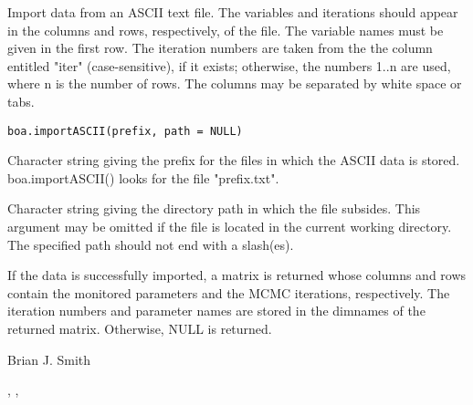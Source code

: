 \begin{Description}\relax
Import data from an ASCII text file. The variables and iterations should
appear in the columns and rows, respectively, of the file. The variable names
must be given in the first row. The iteration numbers are taken from the the
column entitled "iter" (case-sensitive), if it exists; otherwise, the numbers 
1..n are used, where n is the number of rows. The columns may be separated by
white space or tabs.
\end{Description}
\begin{Usage}
\begin{verbatim}
boa.importASCII(prefix, path = NULL)
\end{verbatim}
\end{Usage}
\begin{Arguments}
\begin{ldescription}
\item[\code{prefix}] Character string giving the prefix for the files in which the 
ASCII data is stored. boa.importASCII() looks for the file "prefix.txt".
\item[\code{path}] Character string giving the directory path in which the file
subsides. This argument may be omitted if the file is located in the current
working directory.  The specified path should not end with a slash(es).
\end{ldescription}
\end{Arguments}
\begin{Value}
If the data is successfully imported, a matrix is returned whose columns and
rows contain the monitored parameters and the MCMC iterations, respectively.
The iteration numbers and parameter names are stored in the dimnames of the 
returned matrix. Otherwise, NULL is returned.
\end{Value}
\begin{Author}\relax
Brian J. Smith
\end{Author}
\begin{SeeAlso}\relax
{}, ,
\end{SeeAlso}

